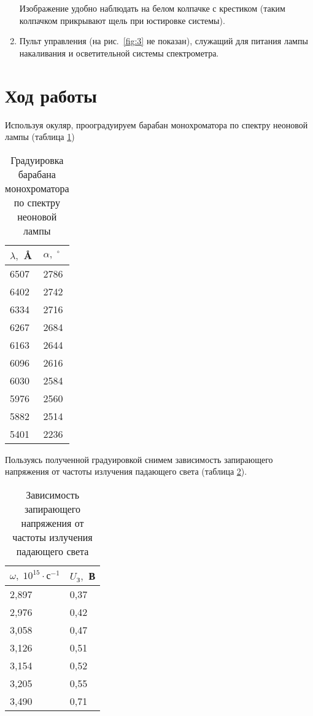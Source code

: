 \documentclass[a4paper]{article}
\begin{document}
\begin{enumerate}
		Изображение удобно наблюдать на белом колпачке
		с крестиком (таким колпачком прикрывают щель при
		юстировке системы).
	\item Пульт управления (на рис.~\ref{fig:3} не показан),
		служащий для питания лампы накаливания и
		осветительной системы спектрометра.
\end{enumerate}
\section{Ход работы}
Используя окуляр, прооградуируем барабан монохроматора по спектру
неоновой лампы (таблица \ref{tab:1})
\begin{table}[h]
\begin{tabular}{|l|l|}
\hline
$\lambda,$ \AA & $\alpha, \; ^\circ$ \\ \hline
6507 & 2786 \\ \hline
6402 & 2742 \\ \hline
6334 & 2716 \\ \hline
6267 & 2684 \\ \hline
6163 & 2644 \\ \hline
6096 & 2616 \\ \hline
6030 & 2584 \\ \hline
5976 & 2560 \\ \hline
5882 & 2514 \\ \hline
5401 & 2236 \\ \hline
\end{tabular}
\caption{Градуировка барабана монохроматора по спектру неоновой
лампы}
\label{tab:1}
\end{table}
Пользуясь полученной градуировкой снимем зависимость запирающего
напряжения от частоты излучения падающего света (таблица \ref{tab:2}).
\begin{table}[h]
\begin{tabular}{|l|l|}
\hline
$\omega,\; 10^{15}\cdot \text{с}^{-1}$&$U_{\text{З}},$ В\\ \hline
2,897 & 0,37 \\ \hline
2,976 & 0,42 \\ \hline
3,058 & 0,47 \\ \hline
3,126 & 0,51 \\ \hline
3,154 & 0,52 \\ \hline
3,205 & 0,55 \\ \hline
3,490 & 0,71 \\ \hline
\end{tabular}
\caption{Зависимость запирающего напряжения от частоты излучения
падающего света}
\label{tab:2}
\end{table}
\end{document}
